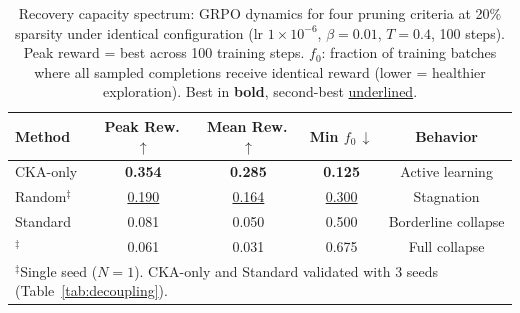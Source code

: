 \begin{table}[t]
\centering
\small
\caption{Recovery capacity spectrum: GRPO dynamics for four pruning criteria at 20\% sparsity under identical configuration (lr $1{\times}10^{-6}$, $\beta{=}0.01$, $T{=}0.4$, 100 steps). Peak reward = best across 100 training steps. $f_0$: fraction of training batches where all sampled completions receive identical reward (lower = healthier exploration). Best in \textbf{bold}, second-best \underline{underlined}.}
\label{tab:recovery_gradient}
\begin{tabular}{@{}lcccc@{}}
\toprule
Method & Peak Rew.\,$\uparrow$ & Mean Rew.\,$\uparrow$ & Min $f_0$\,$\downarrow$ & Behavior \\
\midrule
CKA-only & \textbf{0.354} & \textbf{0.285} & \textbf{0.125} & Active learning \\
Random$^\ddagger$ & \underline{0.190} & \underline{0.164} & \underline{0.300} & Stagnation \\
Standard & 0.081 & 0.050 & 0.500 & Borderline collapse \\
\rasp{}$^\ddagger$ & 0.061 & 0.031 & 0.675 & Full collapse \\
\bottomrule
\multicolumn{5}{l}{\footnotesize $^\ddagger$Single seed ($N{=}1$). CKA-only and Standard validated with 3 seeds (Table~\ref{tab:decoupling}).}
\end{tabular}
\end{table}
